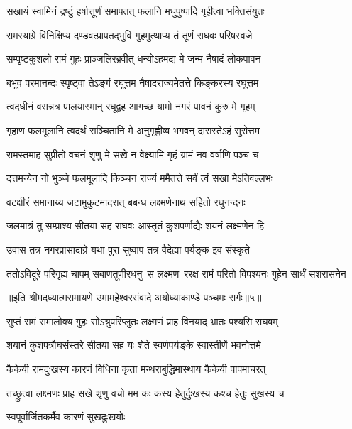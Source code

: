 \twolineshloka
{सखायं स्वामिनं द्रष्टुं हर्षात्तूर्णं समापतत्}
{फलानि मधुपुष्पादि गृहीत्वा भक्तिसंयुतः} %

\twolineshloka
{रामस्याग्रे विनिक्षिप्य दण्डवत्प्रापतद्भुवि}
{गुहमुत्थाप्य तं तूर्णं राघवः परिषस्वजे} %

\twolineshloka
{सम्पृष्टकुशलो रामं गुहः प्राञ्जलिरब्रवीत्}
{धन्योऽहमद्य मे जन्म नैषादं लोकपावन} %

\twolineshloka
{बभूव परमानन्दः स्पृष्ट्वा तेऽङ्गं रघूत्तम}
{नैषादराज्यमेतत्ते किङ्करस्य रघूत्तम} %

\twolineshloka
{त्वदधीनं वसन्नत्र पालयास्मान् रघूद्वह}
{आगच्छ यामो नगरं पावनं कुरु मे गृहम्} %

\twolineshloka
{गृहाण फलमूलानि त्वदर्थं सञ्चितानि मे}
{अनुगृह्णीष्व भगवन् दासस्तेऽहं सुरोत्तम} %

\twolineshloka
{रामस्तमाह सुप्रीतो वचनं शृणु मे सखे}
{न वेक्ष्यामि गृहं ग्रामं नव वर्षाणि पञ्च च} %

\twolineshloka
{दत्तमन्येन नो भुञ्जे फलमूलादि किञ्चन}
{राज्यं ममैतत्ते सर्वं त्वं सखा मेऽतिवल्लभः} %

\twolineshloka
{वटक्षीरं समानाय्य जटामुकुटमादरात्}
{बबन्ध लक्ष्मणेनाथ सहितो रघुनन्दनः} %

\twolineshloka
{जलमात्रं तु सम्प्राश्य सीतया सह राघवः}
{आस्तृतं कुशपर्णाद्यैः शयनं लक्ष्मणेन हि} %

\twolineshloka
{उवास तत्र नगरप्रासादाग्रे यथा पुरा}
{सुष्वाप तत्र वैदेह्या पर्यङ्क इव संस्कृते} %

\fourlineindentedshloka
{ततोऽविदूरे परिगृह्य चापम्}
{सबाणतूणीरधनुः स लक्ष्मणः}
{ररक्ष रामं परितो विपश्यनः}
{गुहेन सार्धं सशरासनेन} %

{॥इति श्रीमदध्यात्मरामायणे उमामहेश्वरसंवादे
अयोध्याकाण्डे पञ्चमः सर्गः॥५॥
}




\twolineshloka
{सुप्तं रामं समालोक्य गुहः सोऽश्रुपरिप्लुतः}
{लक्ष्मणं प्राह विनयाद् भ्रातः पश्यसि राघवम्} %

\twolineshloka
{शयानं कुशपत्रौघसंस्तरे सीतया सह}
{यः शेते स्वर्णपर्यङ्के स्वास्तीर्णे भवनोत्तमे} %

\twolineshloka
{कैकेयी रामदुःखस्य कारणं विधिना कृता}
{मन्थराबुद्धिमास्थाय कैकेयी पापमाचरत्} %

\twolineshloka
{तच्छ्रुत्वा लक्ष्मणः प्राह सखे शृणु वचो मम}
{कः कस्य हेतुर्दुःखस्य कश्च हेतुः सुखस्य च} %

\onelineshloka
{स्वपूर्वार्जितकर्मैव कारणं सुखदुःखयोः} %

